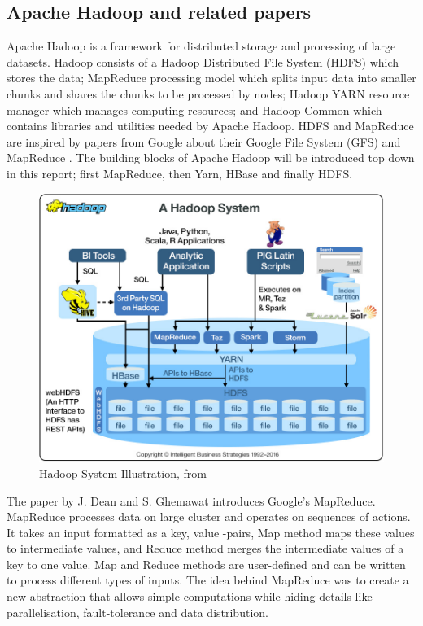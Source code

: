 \documentclass{article}
\theoremstyle{definition}
\begin{document}
\subsection{Apache Hadoop and related papers}
Apache Hadoop is a framework for distributed storage and processing of large datasets. Hadoop consists of a Hadoop Distributed File System (HDFS) which stores the data; MapReduce processing model which splits input data into smaller chunks and shares the chunks to be processed by nodes; Hadoop YARN resource manager which manages computing resources; and Hadoop Common which contains libraries and utilities needed by Apache Hadoop. HDFS and MapReduce are inspired by papers from Google about their Google File System (GFS) \cite{Ghemawat2003} and MapReduce \cite{Dean}. The building blocks of Apache Hadoop will be introduced top down in this report; first MapReduce, then Yarn, HBase and finally HDFS. \\ 

\begin{figure}[H]
\centering
\includegraphics[scale=0.4]{SystemIllustration}
\caption{Hadoop System Illustration, from \cite{bmhadoop}}
\end{figure}

The paper \cite{Dean} by J. Dean and S. Ghemawat introduces Google's MapReduce. MapReduce processes data on large cluster and operates on sequences of actions. It takes an input formatted as a key, value -pairs, Map method maps these values to intermediate values, and Reduce method merges the intermediate values of a key to one value. Map and Reduce methods are user-defined and can be written to process different types of inputs. The idea behind MapReduce was to create a new abstraction that allows simple computations while hiding details like parallelisation, fault-tolerance and data distribution. \\
\end{document}
